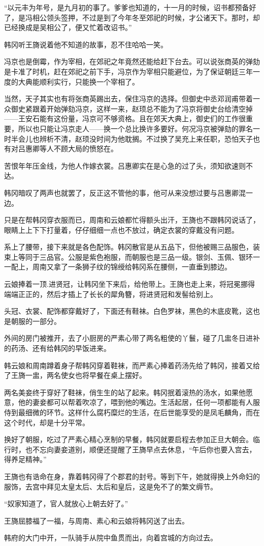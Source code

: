 “以元丰为年号，是九月初的事了。爹爹也知道的，十一月的时候，诏书都预备好了，是冯相公领头签押，不过是到了今年冬至郊祀的时候，才公诸天下。那时，却已经换成是吴相公了，便又忙着改诏书。”

韩冈听王旖说着他不知道的故事，忍不住哈哈一笑。

冯京也是倒霉，作为宰相，在郊祀之年竟然还能给赶下台去。可以说张商英的弹劾是卡准了时机，赶在郊祀之前下手，冯京作为宰相只能避位，为了保证朝廷三年一度的大典能顺利实行，只能换一个宰相了。

当然，天子其实也有将张商英踢出去，保住冯京的选择。但御史中丞邓润甫带着一众御史紧跟着开始弹劾冯京，这样一来，赵顼总不能为了冯京将御史台给清空掉——王安石能有这份量，冯京可不够资格。且在郊天大典上，御史们的工作很重要，所以也只能让冯京走人——换一个总比换许多要好。何况冯京被弹劾的罪名一时半会儿也辨析不清，赵顼没时间为他耽搁。不过换了吴充上来任职，恐怕天子也有对吕惠卿等人不顾大局的愤怒在。

苦恨年年压金线，为他人作嫁衣裳。吕惠卿实在是心急的过了头，须知欲速则不达。

韩冈暗叹了两声也就罢了，反正这不管他的事，他可从来没想过要与吕惠卿混一边。

只是在帮韩冈穿衣服而已，周南和云娘都忙得额头出汗，王旖也不跟韩冈说话了，眼睛上上下下打量着，仔仔细细一点也不放过，确定衣裳的穿戴没有问题。

系上了腰带，接下来就是各色配饰。韩冈散官是从五品下，但他被赐三品服色，装束上等同于三品官。公服是紫色袍服，而朝服也是三品一级。银剑、玉佩、银环一一配上，周南又拿了一条狮子纹的锦绶给韩冈系在腰侧，一直垂到膝边。

云娘捧着一顶.进贤冠，让韩冈坐下来后，给他带上。王旖也走上来，将冠冕挪得端端正正的，然后才插上了长长的犀角簪，将进贤冠和发髻给别上。

头冠、衣裳、配饰都穿戴好了，下面还有鞋袜。白色罗袜，黑色的木底皮靴，这也是朝服的一部分。

外间的房门被推开，去了小厨房的严素心带了两名粗使的丫鬟，碰了几盅冬日进补的药汤、还有给韩冈的早饭进来。

韩云娘和周南蹲着身子帮韩冈穿着鞋袜，而严素心捧着药汤先给了韩冈，接着又给了王旖一盅，两名使女也将早餐在桌上摆好。

两名美妾终于穿好了鞋袜，俏生生的站了起来。韩冈抿着滚热的汤水，如果他愿意，他的妻妾都可以帮着吹凉了，喂到他的嘴边。生活起居，任何一项都能有人服侍到最细微的环节。这样什么腐朽糜烂的生活，在后世能享受的是凤毛麟角，而在这个时代，却是十分平常。

换好了朝服，吃过了严素心精心烹制的早餐，韩冈就要启程去参加正旦大朝会。临行时，也不忘向妻妾道别，顺便还提醒了王旖早点去休息，“午后你也要入宫去，得养足精神。”

王旖也有诰命在身，靠着韩冈得了个郡君的封号。等到下午，她就得换上外命妇的服饰，去宫中拜见太皇太后、太后和皇后，这是免不了的繁文缛节。

“奴家知道了，官人就放心上朝去好了。”

王旖屈膝福了一福，与周南、素心和云娘将韩冈送了出去。

韩府的大门中开，一队骑手从院中鱼贯而出，向着宫城的方向过去。

